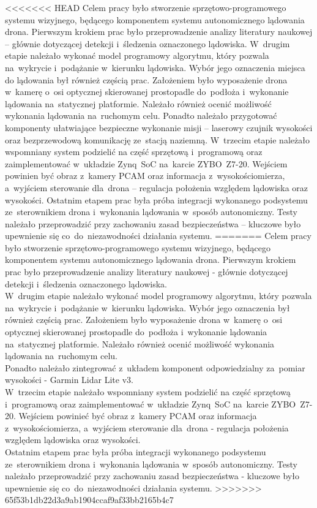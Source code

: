 <<<<<<< HEAD
Celem pracy było stworzenie sprzętowo-programowego systemu wizyjnego, będącego komponentem systemu autonomicznego lądowania drona. 
Pierwszym krokiem prac było przeprowadzenie analizy literatury naukowej -- głównie dotyczącej detekcji i~śledzenia oznaczonego lądowiska. 
W~drugim etapie należało wykonać model programowy algorytmu, który pozwala na~wykrycie i~podążanie w~kierunku  lądowiska. 
Wybór jego oznaczenia miejsca do lądowania był również częścią prac. 
Założeniem było wyposażenie drona w~kamerę o~osi optycznej skierowanej prostopadle do~podłoża i~wykonanie lądowania na~statycznej platformie. 
Należało również ocenić możliwość wykonania lądowania na~ruchomym celu.
Ponadto należało przygotować komponenty ułatwiające bezpieczne wykonanie misji -- laserowy czujnik wysokości oraz bezprzewodową komunikację ze~stacją naziemną. 
W~trzecim etapie należało wspomniany system podzielić na część sprzętową i~programową oraz zaimplementować w~układzie Zynq~SoC na~karcie ZYBO~Z7-20. 
Wejściem powinien być obraz z~kamery PCAM oraz informacja z~wysokościomierza, a~wyjściem sterowanie dla~drona -- regulacja położenia względem lądowiska oraz wysokości.
Ostatnim etapem prac była próba integracji wykonanego podsystemu ze~sterownikiem drona i~wykonania lądowania w~sposób autonomiczny. 
Testy należało przeprowadzić przy zachowaniu zasad bezpieczeństwa -- kluczowe było upewnienie się co~do~niezawodności działania systemu.
=======
Celem pracy było stworzenie sprzętowo-programowego systemu wizyjnego, będącego komponentem systemu autonomicznego lądowania drona. Pierwszym krokiem prac było przeprowadzenie analizy literatury naukowej - głównie dotyczącej detekcji i~śledzenia oznaczonego lądowiska. \\
W~drugim etapie należało wykonać model programowy algorytmu, który pozwala na~wykrycie i~podążanie w~kierunku lądowiska. Wybór jego oznaczenia był również częścią prac. Założeniem było wyposażenie drona w~kamerę o~osi optycznej skierowanej prostopadle do~podłoża i~wykonanie lądowania na~statycznej platformie. Należało również ocenić możliwość wykonania lądowania na~ruchomym celu.\\
Ponadto należało zintegrować z~układem komponent odpowiedzialny za~pomiar wysokości - Garmin Lidar Lite v3. \\
W~trzecim etapie należało wspomniany system podzielić na część sprzętową i~programową oraz zaimplementować w~układzie Zynq~SoC na~karcie ZYBO~Z7-20. Wejściem powinieć być obraz z~kamery PCAM oraz informacja z~wysokościomierza, a~wyjściem sterowanie dla~drona - regulacja położenia względem lądowiska oraz wysokości.\\
Ostatnim etapem prac była próba integracji wykonanego podsystemu ze~sterownikiem drona i~wykonania lądowania w~sposób autonomiczny. Testy należało przeprowadzić przy zachowaniu zasad bezpieczeństwa - kluczowe było upewnienie się co~do~niezawodności działania systemu.
>>>>>>> 65f53b1db22d3a9ab1904ccaf9af33bb2165b4c7

